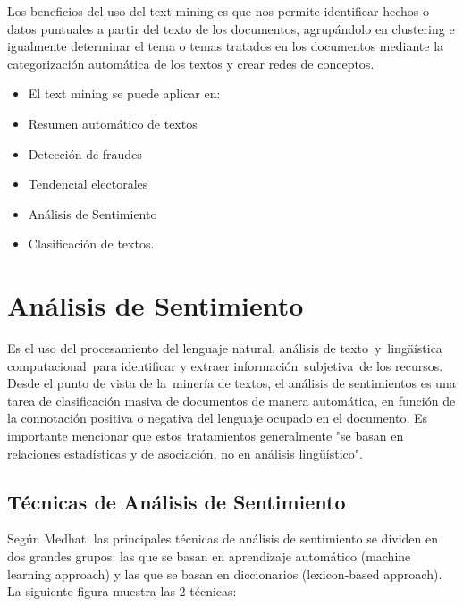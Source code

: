 Los beneficios del uso del text mining es que nos permite identificar hechos o datos puntuales a partir del texto de los documentos, agrup\'andolo en clustering e igualmente determinar el tema o temas tratados en los documentos mediante la categorizaci\'on autom\'atica de los textos y crear redes de conceptos.
		
\begin{itemize}
\item El text mining  se puede aplicar en:
\item Resumen autom\'atico de textos
\item Detecci\'on de fraudes
\item Tendencial electorales
\item An\'alisis de Sentimiento
\item Clasificaci\'on de textos.
\end{itemize}

\section{An\'alisis de Sentimiento}

Es el uso del procesamiento del lenguaje natural, an\'alisis de texto y ling\"aística computacional para identificar y extraer informaci\'on subjetiva de los recursos. Desde el punto de vista de la minería de textos, el an\'alisis de sentimientos es una tarea de clasificaci\'on masiva de documentos de manera autom\'atica, en funci\'on de la connotaci\'on positiva o negativa del lenguaje ocupado en el documento. Es importante mencionar que estos tratamientos generalmente "se basan en relaciones estad\'isticas y de asociaci\'on, no en an\'alisis ling\"uístico".

\subsection{T\'ecnicas de An\'alisis de Sentimiento}

Seg\'un Medhat, las principales t\'ecnicas de an\'alisis de sentimiento se dividen en dos grandes grupos: las que se basan en aprendizaje autom\'atico (machine learning approach) y las que se basan en diccionarios (lexicon-based approach). \\

La siguiente figura muestra las 2 técnicas:\\

